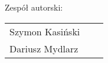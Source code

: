 \begin{titlepage}
\vspace{2ex}

\noindent
\begin{Large}Zespół autorski:\end{Large}
\begin{large}
  \newlength{\tblwidth}
  \setlength{\tblwidth}{\textwidth}
  \addtolength{\tblwidth}{-3em}
  \begin{flushright}
    \begin{tabularx}{\tblwidth}{lXr}
      Szymon Kasiński &  & \\
      Dariusz Mydlarz &  & \\
    \end{tabularx}\end{flushright}
  \end{large}
  \thispagestyle{fancy}
\end{titlepage}
